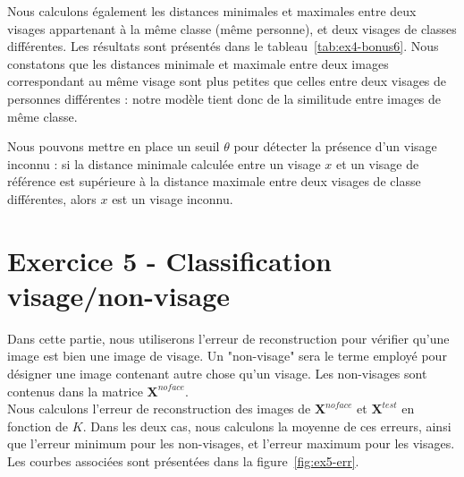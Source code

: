 \documentclass[a4paper]{article}
\newcommand{\figref}[1]{figure~\ref{#1}}
\newcommand{\tabref}[1]{tableau~\ref{#1}}
\begin{document}
Nous calculons également les distances minimales et maximales entre deux visages
appartenant à la même classe (même personne), et deux visages de classes
différentes. Les résultats sont présentés dans le \tabref{tab:ex4-bonus6}. Nous
constatons que les distances minimale et maximale entre deux images
correspondant au même visage sont plus petites que celles entre deux visages de
personnes différentes : notre modèle tient donc de la similitude entre images de
même classe.

\begin{table}
\centering
{}
\caption{Distances min et max entre deux visages de la même classe et de
    classes différentes}
\label{tab:ex4-bonus6}
\end{table}

Nous pouvons mettre en place un seuil $\theta$ pour détecter la présence d'un
visage inconnu : si la distance minimale calculée entre un visage $x$ et un
visage de référence est supérieure à la distance maximale entre deux visages de
classe différentes, alors $x$ est un visage inconnu.

\newpage

\section*{Exercice 5 - Classification visage/non-visage}

Dans cette partie, nous utiliserons l'erreur de reconstruction pour vérifier
qu'une image est bien une image de visage. Un "non-visage" sera le terme employé
pour désigner une image contenant autre chose qu'un visage. Les non-visages sont
contenus dans la matrice $\mathbf{X}^{noface}$.\\

Nous calculons l'erreur de reconstruction des images de $\mathbf{X}^{noface}$ et
$\mathbf{X}^{test}$ en fonction de $K$. Dans les deux cas, nous calculons la
moyenne de ces erreurs, ainsi que l'erreur minimum pour les non-visages, et
l'erreur maximum pour les visages. Les courbes associées sont présentées
dans la \figref{fig:ex5-err}.
\end{document}

